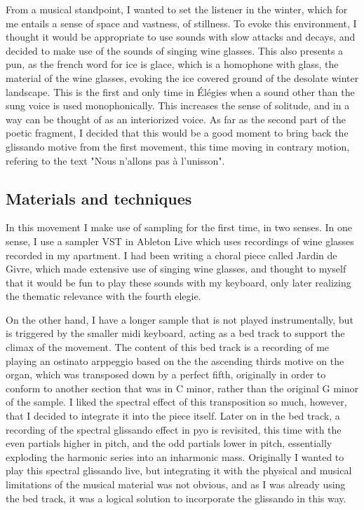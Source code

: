 \documentclass[12pt,twoside,maitrise]{dms_ks}
\theoremstyle{definition}
\begin{document}
{From a musical standpoint, I wanted to set the listener in the winter, which for me entails a sense of space and vastness, of stillness.
To evoke this environment, I thought it would be appropriate to use sounds with slow attacks and decays, and decided to make use of the sounds of singing wine glasses.
This also presents a pun, as the french word for ice is glace, which is a homophone with glass, the material of the wine glasses, evoking the ice covered ground of the desolate winter landscape.
This is the first and only time in Élégies when a sound other than the sung voice is used monophonically. This increases the sense of solitude, and in a way can be thought of as an interiorized voice.
As far as the second part of the poetic fragment, I decided that this would be a good moment to bring back the glissando motive from the first movement, this time moving in contrary motion, refering to the text "Nous n'allons pas à l'unisson".

\subsection{Materials and techniques}

In this movement I make use of sampling for the first time, in two senses.
In one sense, I use a sampler VST in Ableton Live which uses recordings of wine glasses recorded in my apartment.
I had been writing a choral piece called Jardin de Givre, which made extensive use of singing wine glasses, and thought to myself that it would be fun to play these sounds with my keyboard, only later realizing the thematic relevance with the fourth elegie.

On the other hand, I have a longer sample that is not played instrumentally, but is triggered by the smaller midi keyboard, acting as a bed track to support the climax of the movement. The content of this bed track is a recording of me playing an ostinato arppeggio based on the the ascending thirds motive on the organ, which was transposed down by a perfect fifth, originally in order to conform to another section that was in C minor, rather than the original G minor of the sample. I liked the spectral effect of this transposition so much, however, that I decided to integrate it into the piece itself. Later on in the bed track, a recording of the spectral glissando effect in pyo is revisited, this time with the even partials higher in pitch, and the odd partials lower in pitch, essentially exploding the harmonic series into an inharmonic mass. Originally I wanted to play this spectral glissando live, but integrating it with the physical and musical limitations of the musical material was not obvious, and as I was already using the bed track, it was a logical solution to incorporate the glissando in this way.

}
\end{document}

